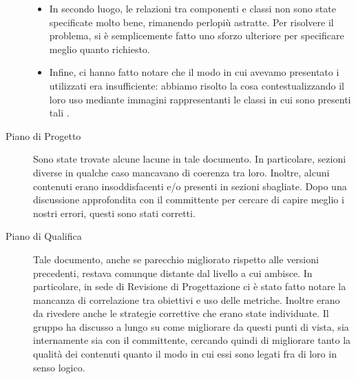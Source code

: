 \begin{description}
\begin{itemize}
				\item In secondo luogo, le relazioni tra componenti e classi non sono state specificate molto bene, rimanendo perlopiù astratte. Per risolvere il problema, si è semplicemente fatto uno sforzo ulteriore per specificare meglio quanto richiesto.
				\item Infine, ci hanno fatto notare che il modo in cui avevamo presentato i  utilizzati era insufficiente: abbiamo risolto la cosa contestualizzando il loro uso mediante immagini rappresentanti le classi in cui sono presenti tali .
			\end{itemize}
			\item[Piano di Progetto] Sono state trovate alcune lacune in tale documento. In particolare, sezioni diverse in qualche caso mancavano di coerenza tra loro. Inoltre, alcuni contenuti erano insoddisfacenti e/o presenti in sezioni sbagliate. Dopo una discussione approfondita con il committente per cercare di capire meglio i nostri errori, questi sono stati corretti.
			\item[Piano di Qualifica] Tale documento, anche se parecchio migliorato rispetto alle versioni precedenti, restava comunque distante dal livello a cui ambisce. In particolare, in sede di Revisione di Progettazione ci è stato fatto notare la mancanza di correlazione tra obiettivi e uso delle metriche. Inoltre erano da rivedere anche le strategie correttive che erano state individuate. Il gruppo ha discusso a lungo su come migliorare da questi punti di vista, sia internamente sia con il committente, cercando quindi di migliorare tanto la qualità dei contenuti quanto il modo in cui essi sono legati fra di loro in senso logico.
		\end{description}
